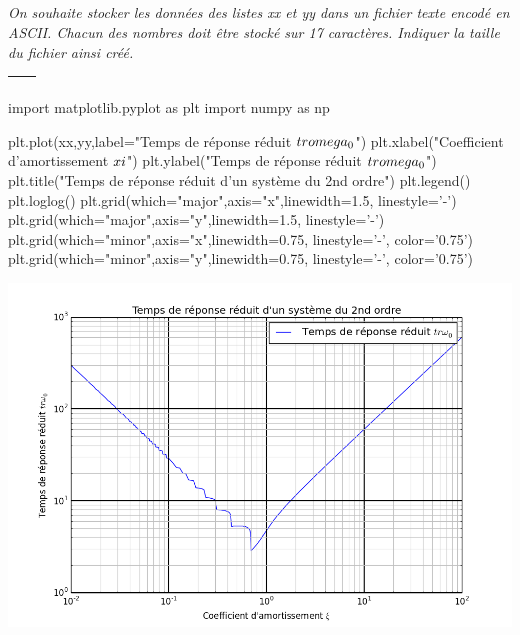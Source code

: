 \documentclass[10pt]{article}
\newif\ifprof
\begin{document}
\fi

\subparagraph{}
\textit{On souhaite stocker les données des listes \textsf{xx} et \textsf{yy} dans un fichier texte encodé en ASCII. Chacun des nombres doit être stocké sur 17 caractères. Indiquer la taille du fichier ainsi créé.}
\ifprof
\begin{corrige}
90 valeurs sont calculées pour chaque intervalles de $z$. $xx$ et $yy$ ont donc une taille de 360 éléments. 
En prenant en compte les 34 caractères, l'espace et le retour à la ligne (2 caractères), une ligne a donc une taille de 37 octets. Le fichier sera donc d'approximativement de 13 320 octets.
\end{corrige}
\else

\begin{tabular}{|p{}|}
\hline
$$\quad$$
\vspace{2cm}
$$\quad$$ \\
\hline
\end{tabular}

\fi
\ifprof
\else

\begin{py}
\begin{python}
import matplotlib.pyplot as plt
import numpy as np

plt.plot(xx,yy,label="Temps de réponse réduit $tr \\omega_0$")
plt.xlabel("Coefficient d'amortissement $\\xi$")
plt.ylabel("Temps de réponse réduit $tr \\omega_0$")
plt.title("Temps de réponse réduit d'un système du 2nd ordre")
plt.legend()
plt.loglog()
plt.grid(which="major",axis="x",linewidth=1.5, linestyle='-')
plt.grid(which="major",axis="y",linewidth=1.5, linestyle='-')
plt.grid(which="minor",axis="x",linewidth=0.75, linestyle='-', color='0.75')
plt.grid(which="minor",axis="y",linewidth=0.75, linestyle='-', color='0.75')
\end{python}
\end{py}

\begin{center}
\includegraphics[width=.8\linewidth]{images/figure_1}
\end{center}
\fi
\end{document}
